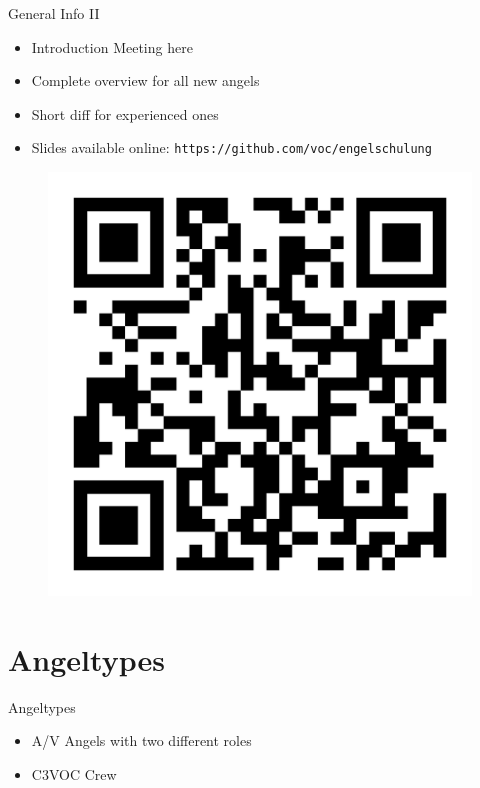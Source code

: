 \documentclass[aspectratio=169]{beamer}
\begin{document}
\begin{frame}{General Info II}
	\begin{itemize}
		\item Introduction Meeting here
		\item Complete overview for all new angels
		\item Short diff for experienced ones
		\item Slides available online: \texttt{https://github.com/voc/engelschulung}
	\end{itemize}
	\begin{figure} 
		\centering
		\includegraphics[height=0.4\textheight]{images/qr-code.png}
	\end{figure}
\end{frame}

\section{Angeltypes}
\begin{frame}{Angeltypes}
	\begin{itemize}
		\item A/V Angels with two different roles
		\item C3VOC Crew
	\end{itemize}
\end{frame}
\end{document}
